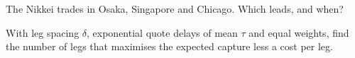 \begin{interviewq}\label{iq:hf:index-and-basket-arbitrage:5}
The Nikkei trades in Osaka, Singapore and Chicago. Which leads, and when?
\end{interviewq}

\begin{interviewq}\label{iq:hf:index-and-basket-arbitrage:6}
With leg spacing $\delta$, exponential quote delays of mean $\tau$ and equal weights, find the number of legs that maximises the expected capture
less a cost per leg.
\end{interviewq}
